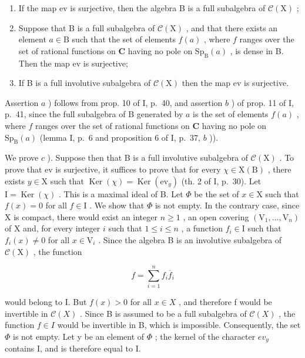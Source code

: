 \begin{enumerate}
\def\labelenumi{\alph{enumi})}
\item
  If the map ev is surjective, then the algebra B is a full subalgebra of \(\mathcal{C}(\mathrm{X})\) ;
\item
  Suppose that B is a full subalgebra of \(\mathcal{C}(\mathrm{X})\) , and that there exists an element \(a \in \mathrm{B}\) such that the set of elements \(f(a)\) , where \(f\) ranges over the set of rational functions on \(\mathbf{C}\) having no pole on \(\mathrm{Sp}_{\mathrm{B}}(a)\) , is dense in B. Then the map ev is surjective;
\item
  If B is a full involutive subalgebra of \(\mathcal{C}(\mathrm{X})\) then the map ev is surjective.
\end{enumerate}

Assertion \(a\) ) follows from prop. 10 of I, p.~40, and assertion \(b\) ) of prop. 11 of I, p.~41, since the full subalgebra of B generated by \(a\) is the set of elements \(f(a)\) , where \(f\) ranges over the set of rational functions on \(\mathbf{C}\) having no pole on \(\mathrm{Sp}_{\mathrm{B}}(a)\) (lemma I, p.~6 and proposition 6 of I, p.~37, \(b\) )).

We prove \(c\) ). Suppose then that B is a full involutive subalgebra of \(\mathcal{C}(\mathrm{X})\) . To prove that ev is surjective, it suffices to prove that for every \(\chi \in \mathrm{X}(\mathrm{B})\) , there exists \(y \in \mathrm{X}\) such that \(\operatorname{Ker}(\chi) = \operatorname{Ker}(\mathrm{ev}_y)\) (th. 2 of I, p.~30). Let \(\mathrm{I} = \operatorname{Ker}(\chi)\) . This is a maximal ideal of B. Let \(\Phi\) be the set of \(x \in \mathrm{X}\) such that \(f(x) = 0\) for all \(f \in \mathrm{I}\) . We show that \(\Phi\) is not empty. In the contrary case, since X is compact, there would exist an integer \(n \geqslant 1\) , an open covering \((\mathrm{V}_1, \ldots, \mathrm{V}_n)\) of X and, for every integer \(i\) such that \(1 \leqslant i \leqslant n\) , a function \(f_i \in \mathrm{I}\) such that \(f_i(x) \neq 0\) for all \(x \in \mathrm{V}_i\) . Since the algebra B is an involutive subalgebra of \(\mathcal{C}(\mathrm{X})\) , the function

\[
f = \sum_ {i = 1} ^ {n} f _ {i} \overline {{f}} _ {i}
\]

would belong to I. But \(f(x) > 0\) for all \(x \in X\) , and therefore f would be invertible in \(\mathcal{C}(X)\) . Since B is assumed to be a full subalgebra of \(\mathcal{C}(X)\) , the function \(f \in I\) would be invertible in B, which is impossible. Consequently, the set \(\Phi\) is not empty. Let y be an element of \(\Phi\) ; the kernel of the character \(ev_{y}\) contains I, and is therefore equal to I.

